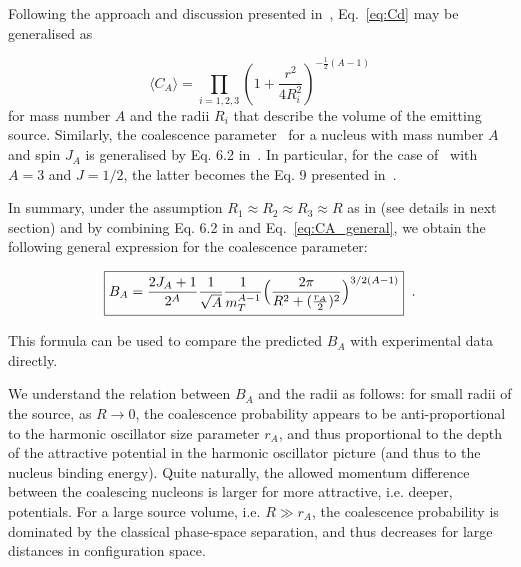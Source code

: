 Following the approach and discussion presented in~\cite{Blum:2017qnn}, Eq.~\ref{eq:Cd} may be generalised as 

\begin{equation}
\langle C_{A} \rangle = \prod_{i=1,2,3} \left(1 + \frac{r^2}{4R_{i}^2} \right)^{-\frac{1}{2}(A-1)}
\label{eq:CA_general}
\end{equation}
%
for mass number $A$ and the radii $R_{i}$ that describe the volume of the emitting source.
Similarly, the coalescence parameter \bA~for a nucleus with mass number $A$ and spin $J_{A}$ is generalised by Eq. 6.2 in~\cite{Scheibl:1998tk}.
In particular, for the case of \hethree~with $A=3$ and $J=1/2$, 
the latter becomes the Eq. 9 presented in~\cite{Blum:2017qnn}.
% 
%
 
In summary, under the assumption $R_1\approx R_2 \approx R_3 \approx R$ as in \cite{Blum:2017qnn} (see details in next section) and by combining %
Eq. 6.2 in \cite{Scheibl:1998tk} and Eq.~\ref{eq:CA_general}, we obtain the following general expression for the coalescence parameter:

\begin{equation}
	\boxed {  B_{A} = {2J_{A} + 1 \over 2^{A}} {1 \over \sqrt{A}} {1 \over m_{T}^{A-1}} \Bigl({2\pi \over R^2 + ({r_A \over 2})^2 }\Bigr)^{3/2(A-1)} } \;\; .
\end{equation}

\noindent This formula can be used to compare the predicted $B_{A}$ with experimental data directly.
 
We understand the relation between $B_A$ and the radii as follows: for small radii of the source, as $R \rightarrow 0$, the coalescence probability appears to be anti-proportional to the harmonic oscillator size parameter $r_A$, and thus proportional to the depth of the attractive potential in the harmonic oscillator picture (and thus to the nucleus binding energy).
Quite naturally, the allowed momentum difference between the coalescing nucleons is larger for more attractive, i.e. deeper, potentials. 
For a large source volume, i.e. $R \gg r_A$, the coalescence probability is dominated by the classical phase-space separation, and thus decreases for large distances in configuration space. 

